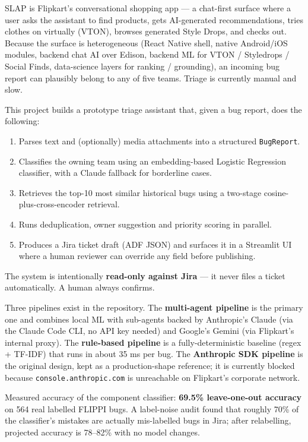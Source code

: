 \documentclass[11pt,a4paper]{article}
\begin{document}
SLAP is Flipkart's conversational shopping app --- a chat-first surface where a
user asks the assistant to find products, gets AI-generated recommendations,
tries clothes on virtually (VTON), browses generated Style Drops, and checks
out. Because the surface is heterogeneous (React Native shell, native
Android/iOS modules, backend chat AI over Edison, backend ML for VTON /
Styledrops / Social Finds, data-science layers for ranking / grounding), an
incoming bug report can plausibly belong to any of five teams. Triage is
currently manual and slow.

This project builds a prototype triage assistant that, given a bug report,
does the following:

\begin{enumerate}[nosep]
\item Parses text and (optionally) media attachments into a structured
      \texttt{BugReport}.
\item Classifies the owning team using an embedding-based Logistic Regression
      classifier, with a Claude fallback for borderline cases.
\item Retrieves the top-10 most similar historical bugs using a two-stage
      cosine-plus-cross-encoder retrieval.
\item Runs deduplication, owner suggestion and priority scoring in parallel.
\item Produces a Jira ticket draft (ADF JSON) and surfaces it in a Streamlit
      UI where a human reviewer can override any field before publishing.
\end{enumerate}

The system is intentionally \textbf{read-only against Jira} --- it never
files a ticket automatically. A human always confirms.

Three pipelines exist in the repository. The \textbf{multi-agent pipeline} is
the primary one and combines local ML with sub-agents backed by Anthropic's
Claude (via the Claude Code CLI, no API key needed) and Google's Gemini (via
Flipkart's internal proxy). The \textbf{rule-based pipeline} is a
fully-deterministic baseline (regex + TF-IDF) that runs in about 35 ms per
bug. The \textbf{Anthropic SDK pipeline} is the original design, kept as a
production-shape reference; it is currently blocked because
\texttt{console.anthropic.com} is unreachable on Flipkart's corporate network.

Measured accuracy of the component classifier: \textbf{69.5\% leave-one-out
accuracy} on 564 real labelled FLIPPI bugs. A label-noise audit found that
roughly 70\% of the classifier's mistakes are actually mis-labelled bugs in
Jira; after relabelling, projected accuracy is 78--82\% with no model
changes.
\end{document}
